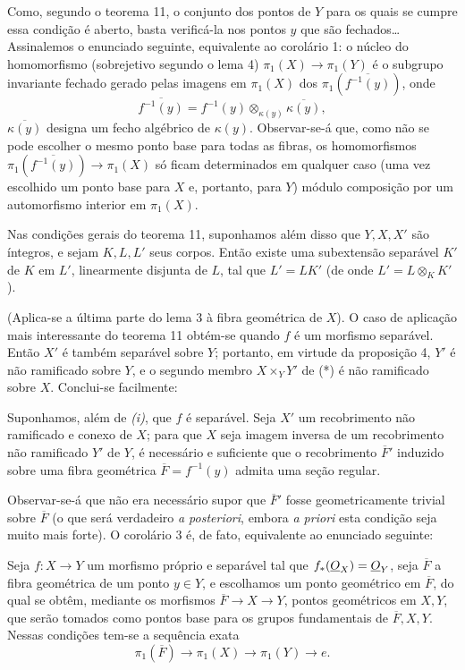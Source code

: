Como, segundo o teorema 11, o conjunto dos pontos de $Y$ para os quais se
cumpre essa condição é aberto, basta verificá-la nos pontos $y$ que são
fechados\ldots{} Assinalemos o enunciado seguinte, equivalente ao corolário 1:
o núcleo do homomorfismo (sobrejetivo segundo o lema 4)
$\pi_1(X)\longrightarrow\pi_1(Y)$ é o subgrupo invariante fechado gerado
pelas imagens em $\pi_1(X)$ dos $\pi_1(\overline{f^{-1}(y)})$, onde
\[
  \overline{f^{-1}(y)}
  =f^{-1}(y)\otimes_{\kappa(y)}\overline{\kappa(y)},
\]
$\overline{\kappa(y)}$ designa um fecho algébrico de $\kappa(y)$. Observar-se-á
que, como não se pode escolher o mesmo ponto base para todas as fibras,
os homomorfismos $\pi_1(\overline{f^{-1}(y)})\longrightarrow\pi_1(X)$ só
ficam determinados em qualquer caso (uma vez escolhido um ponto base para $X$
e, portanto, para $Y$) módulo composição por um automorfismo interior em
$\pi_1(X)$.

 Nas condições gerais do teorema 11, suponhamos
além disso que $Y,X,X'$ são íntegros, e sejam $K,L,L'$ seus corpos. Então existe
uma subextensão separável $K'$ de $K$ em $L'$, linearmente disjunta de $L$, tal
que $L'=LK'$ (de onde $L'=L\otimes_K K'$).

(Aplica-se a última parte do lema 3 à fibra geométrica de $X$). O caso de
aplicação mais interessante do teorema 11 obtém-se quando $f$ é um morfismo
separável. Então $X'$ é também separável sobre $Y$; portanto, em virtude
da proposição 4, $Y'$ é não ramificado sobre $Y$, e o segundo membro
$X\times_Y Y'$ de (*) é não ramificado sobre $X$. Conclui-se facilmente:

 Suponhamos, além de \textit{(i)}, que $f$ é separável.
Seja $X'$ um recobrimento não ramificado e conexo de $X$; para que
$X$ seja imagem inversa de um
recobrimento não ramificado $Y'$ de $Y$, é necessário e suficiente que o
recobrimento $\overline F'$ induzido sobre uma fibra geométrica
$\overline F=f^{-1}(y)$ admita uma seção regular.

Observar-se-á que não era necessário supor que $\overline F'$ fosse
geometricamente trivial sobre $\overline F$ (o que será verdadeiro \textit{a
posteriori}, embora \textit{a priori} esta condição seja muito mais forte). O
corolário 3 é, de fato, equivalente ao enunciado seguinte:

 Seja $f:X\longrightarrow Y$ um morfismo próprio e separável
tal que $f_*(\underline{O}_X)=\underline{O}_Y$, seja $\overline F$ a fibra geométrica de um ponto
$y\in Y$, e escolhamos um ponto geométrico em $\overline F$, do qual se obtêm,
mediante os morfismos $\overline F\longrightarrow X\longrightarrow Y$, pontos
geométricos em $X,Y$, que serão tomados como pontos base para os grupos
fundamentais de $\overline F,X,Y$. Nessas condições tem-se a sequência
exata
\[
  \boxed{
    \pi_1(\overline F)\longrightarrow\pi_1(X)
    \longrightarrow\pi_1(Y)\longrightarrow e
  }.
\]

